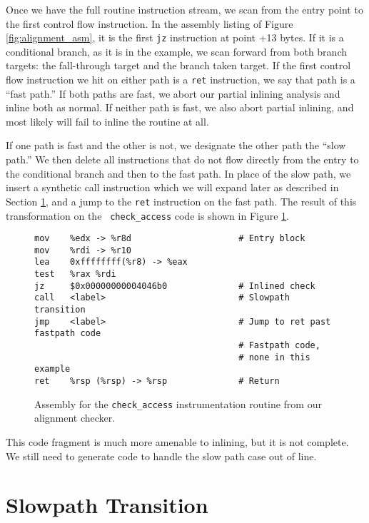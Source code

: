 Once we have the full routine instruction stream, we scan from the entry point
to the first control flow instruction.  In the assembly listing of Figure
\ref{fig:alignment_asm}, it is the first {\tt jz} instruction at point +13
bytes.  If it is a conditional branch, as it is in the example, we scan forward
from both branch targets: the fall-through target and the branch taken target.
If the first control flow instruction we hit on either path is a {\tt ret}
instruction, we say that path is a ``fast path.''  If both paths are fast, we
abort our partial inlining analysis and inline both as normal.  If neither path
is fast, we also abort partial inlining, and most likely will fail to inline the
routine at all.

If one path is fast and the other is not, we designate the other path the
``slow path.''  We then delete all instructions that do not flow directly from
the entry to the conditional branch and then to the fast path.  In place of the
slow path, we insert a synthetic call instruction which we will expand later as
described in Section \ref{sec:slowpath_transition}, and a jump to the {\tt ret}
instruction on the fast path.  The result of this transformation on the {\tt
check\_access} code is shown in Figure \ref{fig:alignment_fastpath}.

\begin{figure}
\begin{verbatim}
mov    %edx -> %r8d                     # Entry block
mov    %rdi -> %r10
lea    0xffffffff(%r8) -> %eax
test   %rax %rdi
jz     $0x00000000004046b0              # Inlined check
call   <label>                          # Slowpath transition
jmp    <label>                          # Jump to ret past fastpath code
                                        # Fastpath code,
                                        # none in this example
ret    %rsp (%rsp) -> %rsp              # Return
\end{verbatim}
\caption{Assembly for the {\tt check\_access} instrumentation routine from our
alignment checker.}
\label{fig:alignment_fastpath}
\end{figure}

This code fragment is much more amenable to inlining, but it is not complete.
We still need to generate code to handle the slow path case out of line.

\section{Slowpath Transition}
\label{sec:slowpath_transition}

